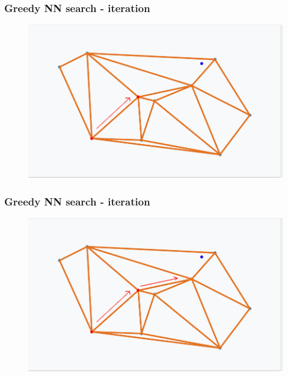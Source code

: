 \documentclass{beamer}
\begin{document}
  \begin{frame}
    \frametitle{Greedy NN search - iteration}  
  \begin{figure}[greedy_search_start_new_step_1_2]
    \vspace*{-0.1cm}
  	\includegraphics[scale=0.3]{greedy_search_start_new_step_1_2} 	
  \end{figure} 
  \end{frame}     
  

  \begin{frame}
    \frametitle{Greedy NN search - iteration}  
  \begin{figure}[greedy_search_start_new_step_2_1]
    \vspace*{-0.1cm}
  	\includegraphics[scale=0.3]{greedy_search_start_new_step_2_1} 	
  \end{figure} 
  \end{frame}       
  
\end{document}
